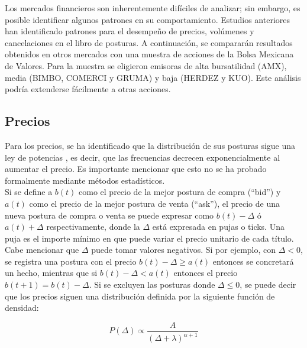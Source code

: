 \documentclass[11pt]{article}
\numberwithin{equation}{section} %
\begin{document}
Los mercados financieros son inherentemente difíciles de analizar; sin embargo, es posible identificar algunos patrones en su comportamiento. Estudios anteriores \cite{Bouchaud2002,zovko2002power,marketsdigest} han identificado patrones para el desempeño de precios, volúmenes y cancelaciones en el libro de posturas. A continuación, se compararán resultados obtenidos en otros mercados con una muestra de acciones de la Bolsa Mexicana de Valores. Para la muestra se eligieron emisoras de alta bursatilidad (AMX), media (BIMBO, COMERCI y GRUMA) y baja (HERDEZ y KUO). Este análisis podría extenderse fácilmente a otras acciones.\\

\subsection{Precios}

Para los precios, se ha identificado que la distribución de sus posturas sigue una ley de potencias \cite{Bouchaud2002}, es decir, que las frecuencias decrecen exponencialmente al aumentar el precio. Es importante mencionar que esto no se ha probado formalmente mediante métodos estadísticos.\\

Si se define a $b(t)$ como el precio de la mejor postura de compra (``bid'') y $a(t)$ como el precio de la mejor postura de venta (``ask''), el precio de una nueva postura de compra o venta se puede expresar como $b(t)-\Delta$ ó $a(t)+\Delta$ respectivamente, donde la $\Delta$ está expresada en pujas o ticks. Una puja es el importe mínimo en que puede variar el precio unitario de cada título. Cabe mencionar que $\Delta$ puede tomar valores negativos. Si por ejemplo, con $\Delta <0$, se registra una postura con el precio $b(t)-\Delta \geq a(t)$ entonces se concretará un hecho, mientras que si $b(t)-\Delta < a(t)$ entonces el precio $b(t+1)=b(t)-\Delta$. Si se excluyen las posturas donde $\Delta \leq 0$, se puede decir que los precios siguen una distribución definida por la siguiente función de densidad:

\begin{equation}
P\left(\Delta\right) \propto \frac{A}{{\left(\Delta+\lambda\right)}^{\alpha+1}}
\end{equation}
\end{document}
